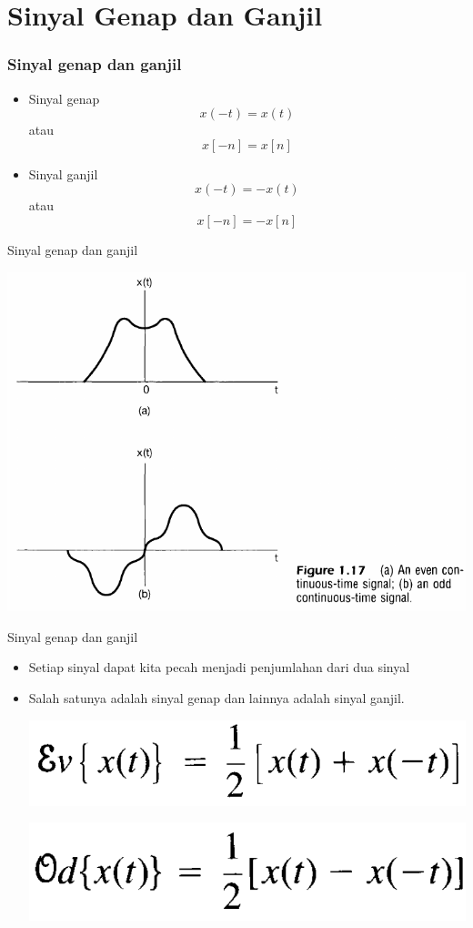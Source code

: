 \documentclass[pdflatex,compress,mathserif]{beamer}
\begin{document}
\section{Sinyal Genap dan Ganjil}

\begin{frame}
	\frametitle{Sinyal genap dan ganjil}
	\begin{itemize}
		\item Sinyal genap
		$$ x(-t) = x(t) $$ atau $$ x[-n] = x[n] $$
		\item Sinyal ganjil
		$$ x(-t) = -x(t) $$ atau $$ x[-n] = -x[n] $$
	\end{itemize}
\end{frame}

\begin{frame}{Sinyal genap dan ganjil}
	\begin{center}
		\includegraphics[width=0.8\linewidth]{img/img28}
	\end{center}
\end{frame}

\begin{frame}{Sinyal genap dan ganjil}
	\begin{itemize}
		\item Setiap sinyal dapat kita pecah menjadi penjumlahan dari dua sinyal
		\item Salah satunya adalah sinyal genap dan lainnya adalah sinyal ganjil.
		\begin{center}
			\includegraphics[width=0.5\linewidth]{img/img31}
		\end{center}
		\begin{center}
			\includegraphics[width=0.5\linewidth]{img/img32}
		\end{center}
	\end{itemize}
\end{frame}
\end{document}
